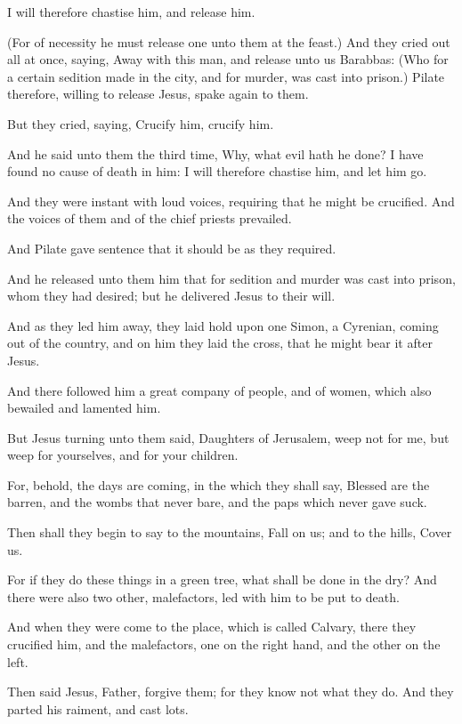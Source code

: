 \verse I will therefore chastise him, and release him.

\verse (For of necessity he must release one unto them at the feast.)  \verse And they cried out all at once, saying, Away with this man, and release unto us Barabbas: \verse (Who for a certain sedition made in the city, and for murder, was cast into prison.)  \verse Pilate therefore, willing to release Jesus, spake again to them.

\verse But they cried, saying, Crucify him, crucify him.

\verse And he said unto them the third time, Why, what evil hath he done? I have found no cause of death in him: I will therefore chastise him, and let him go.

\verse And they were instant with loud voices, requiring that he might be crucified. And the voices of them and of the chief priests prevailed.

\verse And Pilate gave sentence that it should be as they required.

\verse And he released unto them him that for sedition and murder was cast into prison, whom they had desired; but he delivered Jesus to their will.

\verse And as they led him away, they laid hold upon one Simon, a Cyrenian, coming out of the country, and on him they laid the cross, that he might bear it after Jesus.

\verse And there followed him a great company of people, and of women, which also bewailed and lamented him.

\verse But Jesus turning unto them said, Daughters of Jerusalem, weep not for me, but weep for yourselves, and for your children.

\verse For, behold, the days are coming, in the which they shall say, Blessed are the barren, and the wombs that never bare, and the paps which never gave suck.

\verse Then shall they begin to say to the mountains, Fall on us; and to the hills, Cover us.

\verse For if they do these things in a green tree, what shall be done in the dry?  \verse And there were also two other, malefactors, led with him to be put to death.

\verse And when they were come to the place, which is called Calvary, there they crucified him, and the malefactors, one on the right hand, and the other on the left.

\verse Then said Jesus, Father, forgive them; for they know not what they do. And they parted his raiment, and cast lots.

